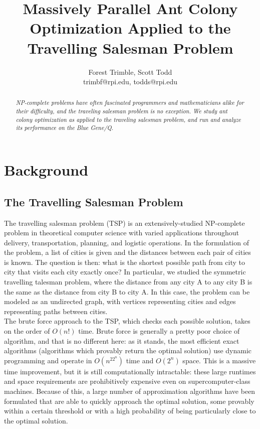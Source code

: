 \documentclass[twocolumn]{article}
\title{Massively Parallel Ant Colony Optimization Applied to the Travelling Salesman Problem}
\author{Forest Trimble, Scott Todd\\trimbf@rpi.edu, todds@rpi.edu}
\begin{document}
\maketitle

\pagestyle{fancy}
\fancyhead{}
\fancyhead[R]{\today}


\begin{abstract}
  \emph{NP-complete problems have often fascinated programmers and mathematicians alike
  for their difficulty, and the traveling salesman problem is no exception. We 
  study ant colony optimization as applied to the traveling salesman problem, 
  and run and analyze its performance on the Blue Gene/Q. }
\end{abstract}

\section{Background}

\subsection{The Travelling Salesman Problem}

The travelling salesman problem (TSP) is an extensively-studied NP-complete problem 
in theoretical computer science with varied applications throughout delivery, 
transportation, planning, and logistic operations. In the formulation of the 
problem, a list of cities is given and the distances between each pair of cities
is known. The question is then: what is the shortest possible path from city to
city that visits each city exactly once? In particular, we studied the symmetric
travelling talesman problem, where the distance from any city A to any city B
is the same as the distance from city B to city A. In this case, the problem
can be modeled as an undirected graph, with vertices representing cities and
edges representing paths between cities.\\

The brute force approach to the TSP, which checks each possible solution, takes 
on the order of $O(n!)$ time. Brute force is generally a pretty poor choice of
algorithm, and that is no different here: as it stands, the most efficient exact 
algorithms (algorithms which provably return the optimal solution) use dynamic
programming and operate in $O(n^22^n)$ time and $O(2^n)$ space. 
This is a massive time improvement, but it is still computationally intractable: 
these large runtimes and space requirements are prohibitively expensive even on 
supercomputer-class machines. Because of this, a large number of approximation 
algorithms have been formulated that are able to quickly approach the optimal 
solution, some provably within a certain threshold or with a high probability of
being particularly close to the optimal solution. 
\end{document}

